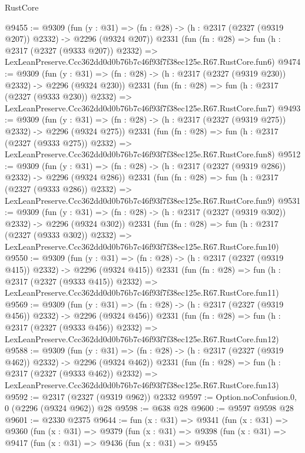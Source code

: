 \begin{lexlean}{RustCore}
\begin{coremodule}
@9455 := @9309
    (fun (y : @31) => (fn : @28) -> (h : @2317 (@2327 (@9319 @207)) @2332) -> @2296 (@9324 @207))
    @2331
    (fun (fn : @28) =>
    fun (h : @2317 (@2327 (@9333 @207)) @2332) =>
    LexLeanPreserve.Ccc362dd0d0b76b7c46f93f7f38ec125e.R67.RustCore.fun6)
@9474 := @9309
    (fun (y : @31) => (fn : @28) -> (h : @2317 (@2327 (@9319 @230)) @2332) -> @2296 (@9324 @230))
    @2331
    (fun (fn : @28) =>
    fun (h : @2317 (@2327 (@9333 @230)) @2332) =>
    LexLeanPreserve.Ccc362dd0d0b76b7c46f93f7f38ec125e.R67.RustCore.fun7)
@9493 := @9309
    (fun (y : @31) => (fn : @28) -> (h : @2317 (@2327 (@9319 @275)) @2332) -> @2296 (@9324 @275))
    @2331
    (fun (fn : @28) =>
    fun (h : @2317 (@2327 (@9333 @275)) @2332) =>
    LexLeanPreserve.Ccc362dd0d0b76b7c46f93f7f38ec125e.R67.RustCore.fun8)
@9512 := @9309
    (fun (y : @31) => (fn : @28) -> (h : @2317 (@2327 (@9319 @286)) @2332) -> @2296 (@9324 @286))
    @2331
    (fun (fn : @28) =>
    fun (h : @2317 (@2327 (@9333 @286)) @2332) =>
    LexLeanPreserve.Ccc362dd0d0b76b7c46f93f7f38ec125e.R67.RustCore.fun9)
@9531 := @9309
    (fun (y : @31) => (fn : @28) -> (h : @2317 (@2327 (@9319 @302)) @2332) -> @2296 (@9324 @302))
    @2331
    (fun (fn : @28) =>
    fun (h : @2317 (@2327 (@9333 @302)) @2332) =>
    LexLeanPreserve.Ccc362dd0d0b76b7c46f93f7f38ec125e.R67.RustCore.fun10)
@9550 := @9309
    (fun (y : @31) => (fn : @28) -> (h : @2317 (@2327 (@9319 @415)) @2332) -> @2296 (@9324 @415))
    @2331
    (fun (fn : @28) =>
    fun (h : @2317 (@2327 (@9333 @415)) @2332) =>
    LexLeanPreserve.Ccc362dd0d0b76b7c46f93f7f38ec125e.R67.RustCore.fun11)
@9569 := @9309
    (fun (y : @31) => (fn : @28) -> (h : @2317 (@2327 (@9319 @456)) @2332) -> @2296 (@9324 @456))
    @2331
    (fun (fn : @28) =>
    fun (h : @2317 (@2327 (@9333 @456)) @2332) =>
    LexLeanPreserve.Ccc362dd0d0b76b7c46f93f7f38ec125e.R67.RustCore.fun12)
@9588 := @9309
    (fun (y : @31) => (fn : @28) -> (h : @2317 (@2327 (@9319 @462)) @2332) -> @2296 (@9324 @462))
    @2331
    (fun (fn : @28) =>
    fun (h : @2317 (@2327 (@9333 @462)) @2332) =>
    LexLeanPreserve.Ccc362dd0d0b76b7c46f93f7f38ec125e.R67.RustCore.fun13)
@9592 := @2317 (@2327 (@9319 @962)) @2332
@9597 := Option.noConfusion.{0, 0} (@2296 (@9324 @962)) @28
@9598 := @638 @28
@9600 := @9597 @9598 @28
@9601 := @2330 @2375
@9644 := fun (x : @31) =>
  @9341
    (fun (x : @31) =>
    @9360
      (fun (x : @31) =>
      @9379
        (fun (x : @31) =>
        @9398
          (fun (x : @31) =>
          @9417
            (fun (x : @31) =>
            @9436
              (fun (x : @31) =>
              @9455

\end{coremodule}
\end{lexlean}
